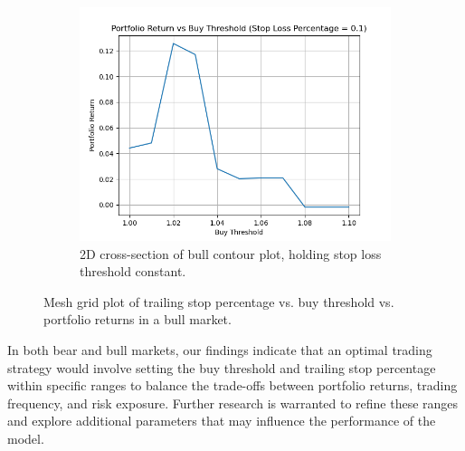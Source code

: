 \documentclass{article}
\begin{document}
\begin{figure}[H]
\begin{subfigure}{0.495\textwidth}
        \label{fig:bullbuyPlot}
    \end{subfigure}
    \label{fig:buyparameters}
    \begin{subfigure}{0.495\textwidth}
        \centering
        \includegraphics[width=\linewidth]{bullBuySlice.png}
        \caption{2D cross-section of bull contour plot, holding stop loss threshold constant.}
        \label{fig:bullstopPlot}
    \end{subfigure}
    \caption{Mesh grid plot of trailing stop percentage vs. buy threshold vs. portfolio returns in a bull market.}
\end{figure}
In both bear and bull markets, our findings indicate that an optimal trading strategy would involve setting the buy threshold and trailing stop percentage within specific ranges to balance the trade-offs between portfolio returns, trading frequency, and risk exposure. Further research is warranted to refine these ranges and explore additional parameters that may influence the performance of the model.
\end{document}

